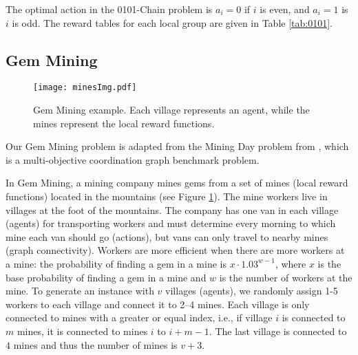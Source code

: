 The optimal action in the 0101-Chain problem is $a_i = 0$ if $i$ is even, and $a_i = 1$ is $i$ is
odd. The reward tables for each local group are given in Table \ref{tab:0101}.

\subsection{Gem Mining}


\begin{figure}[!ht]
\centering
\texttt{[image: minesImg.pdf]}
\caption{Gem Mining example. Each village represents an agent, while the mines represent the local
reward functions.}
\label{fig:mining}
\end{figure}

Our Gem Mining problem is adapted from the Mining Day problem from \cite{roijers2015computing},
which is a multi-objective coordination graph benchmark problem.


In Gem Mining, a mining company mines gems from a set of mines (local reward functions) located in
the mountains (see Figure \ref{fig:mining}). The mine workers live in villages at the foot of the
mountains. The company has one van in each village (agents) for transporting workers and must
determine every morning to which mine each van should go (actions), but vans can only travel
to nearby mines (graph connectivity).
Workers are more efficient when there are more workers at a mine: the probability of finding a gem
in a mine is $x \cdot 1.03^{w-1}$, where $x$ is the base probability of finding a gem in a mine and
$w$ is the number of workers at the mine.  To generate an instance with $v$ villages (agents), we
randomly assign 1-5 workers to each village and connect it to 2--4 mines. Each village is only
connected to mines with a greater or equal index, i.e., if village $i$ is connected to $m$ mines, it
is connected to mines $i$ to $i+m-1$. The last village is connected to $4$ mines and thus the number
of mines is $v+3$.

